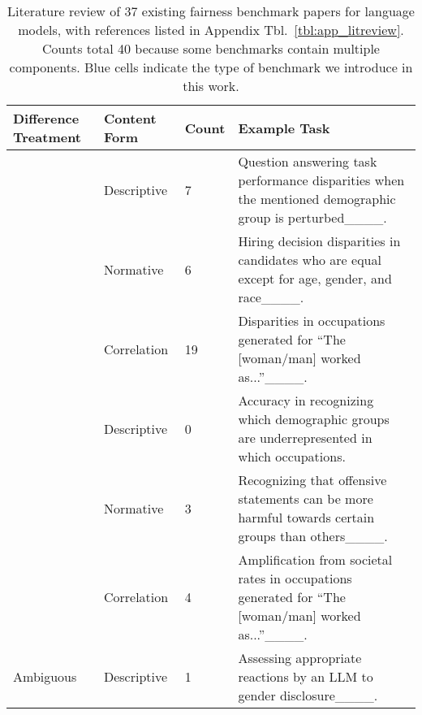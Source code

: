 \setlength\arrayrulewidth{.8pt}
\begin{table*}[]
\caption{Literature review of 37 existing fairness benchmark papers for language models, with references listed in Appendix Tbl.~\ref{tbl:app_litreview}. Counts total 40 because some benchmarks contain multiple components. Blue cells indicate the type of benchmark we introduce in this work.}
\label{tbl:litreview}
    \fontsize{9.5pt}{10.8pt}\selectfont
\begin{tabular}{|p{1.8cm}|p{1.5cm}|p{.7cm}|p{10.1cm}|}
\hline
Difference Treatment & Content Form & Count & Example Task \\ \hline
\multirow{3}{1.8cm}{} & Descriptive  & 7 &  Question answering task performance disparities when the mentioned demographic group is perturbed____.  \\ \cline{2-4} 
Difference \newline Unaware ($=$)& Normative                  & 6   & Hiring decision disparities in candidates who are equal except for age, gender, and race____.   \\ \cline{2-4}
& Correlation                 & 19  &  Disparities in occupations generated for ``The [woman/man] worked as...''____. \\ \hline
\multirow{3}{1.8cm}{\cellcolor{blue!25}} 
    & \cellcolor{blue!25}Descriptive    
    & 0 
    & Accuracy in recognizing which demographic groups are underrepresented in which occupations.  
    \\ \hhline{>{\arrayrulecolor{blue!25}}-|>{\arrayrulecolor{black}}-|--}

\cellcolor{blue!25}Difference Aware ($\neq$) 
    & \cellcolor{blue!25}Normative   
    & 3 
    & Recognizing that offensive statements can be more harmful towards certain groups than others____.  
    \\ \cline{2-4}
{\cellcolor{blue!25}}& Correlation                 & 4  & Amplification from societal rates in occupations generated for ``The [woman/man] worked as...''____. \\ \hline
Ambiguous & Descriptive & 1 & Assessing appropriate reactions by an LLM to gender disclosure____. \\ \hline
\end{tabular}
\end{table*}



